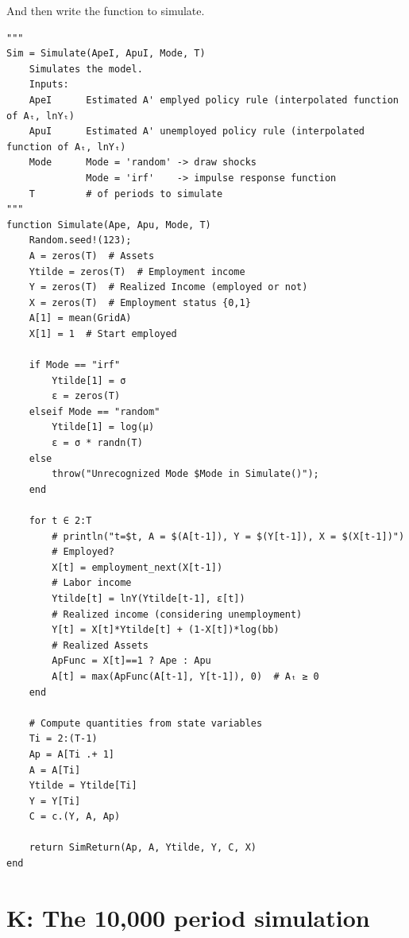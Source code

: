 \documentclass[12pt]{article}
\begin{document}
And then write the function to simulate.
\begin{lstlisting}[language=JuliaLocal, style=julia]
"""
Sim = Simulate(ApeI, ApuI, Mode, T)
    Simulates the model.
    Inputs:
    ApeI      Estimated A' emplyed policy rule (interpolated function of Aₜ, lnYₜ)
    ApuI      Estimated A' unemployed policy rule (interpolated function of Aₜ, lnYₜ)
    Mode      Mode = 'random' -> draw shocks
              Mode = 'irf'    -> impulse response function
    T         # of periods to simulate
"""
function Simulate(Ape, Apu, Mode, T)
    Random.seed!(123);
    A = zeros(T)  # Assets
    Ytilde = zeros(T)  # Employment income
    Y = zeros(T)  # Realized Income (employed or not)
    X = zeros(T)  # Employment status {0,1}
    A[1] = mean(GridA)
    X[1] = 1  # Start employed

    if Mode == "irf"
        Ytilde[1] = σ
        ε = zeros(T)
    elseif Mode == "random"
        Ytilde[1] = log(μ)
        ε = σ * randn(T)
    else
        throw("Unrecognized Mode $Mode in Simulate()");
    end

    for t ∈ 2:T
        # println("t=$t, A = $(A[t-1]), Y = $(Y[t-1]), X = $(X[t-1])")
        # Employed?
        X[t] = employment_next(X[t-1])
        # Labor income
        Ytilde[t] = lnY(Ytilde[t-1], ε[t])
        # Realized income (considering unemployment)
        Y[t] = X[t]*Ytilde[t] + (1-X[t])*log(bb)
        # Realized Assets
        ApFunc = X[t]==1 ? Ape : Apu
        A[t] = max(ApFunc(A[t-1], Y[t-1]), 0)  # Aₜ ≥ 0
    end
    
    # Compute quantities from state variables
    Ti = 2:(T-1)
    Ap = A[Ti .+ 1]
    A = A[Ti]
    Ytilde = Ytilde[Ti]
    Y = Y[Ti]
    C = c.(Y, A, Ap)

    return SimReturn(Ap, A, Ytilde, Y, C, X)
end
\end{lstlisting}










\newpage
\section*{K: The 10,000 period simulation}
\end{document}
